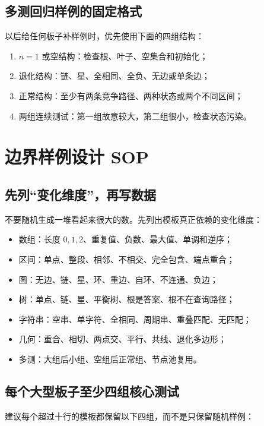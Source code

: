 \documentclass[UTF8,openany,oneside,zihao=-4]{ctexbook}
\begin{document}
\subsection{多测回归样例的固定格式}

以后给任何板子补样例时，优先使用下面的四组结构：

\begin{enumerate}
  \item $n=1$ 或空结构：检查根、叶子、空集合和初始化；
  \item 退化结构：链、星、全相同、全负、无边或单条边；
  \item 正常结构：至少有两条竞争路径、两种状态或两个不同区间；
  \item 两组连续测试：第一组故意较大，第二组很小，检查状态污染。
\end{enumerate}

\section{边界样例设计 SOP}

\subsection{先列“变化维度”，再写数据}

不要随机生成一堆看起来很大的数。先列出模板真正依赖的变化维度：

\begin{itemize}
  \item 数组：长度 $0,1,2$、重复值、负数、最大值、单调和逆序；
  \item 区间：单点、整段、相邻、不相交、完全包含、端点重合；
  \item 图：无边、链、星、环、重边、自环、不连通、负边；
  \item 树：单点、链、星、平衡树、根是答案、根不在查询路径；
  \item 字符串：空串、单字符、全相同、周期串、重叠匹配、无匹配；
  \item 几何：重合、相切、两点交、平行、共线、退化多边形；
  \item 多测：大组后小组、空组后正常组、节点池复用。
\end{itemize}

\subsection{每个大型板子至少四组核心测试}

建议每个超过十行的模板都保留以下四组，而不是只保留随机样例：
\end{document}
